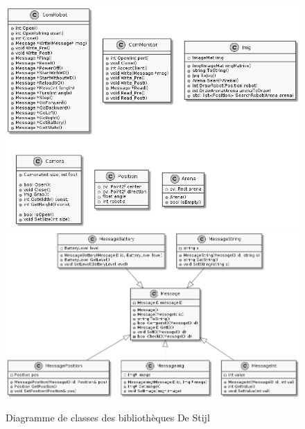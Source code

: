 \begin{appendices}
 \begin{figure}[htbp]
\begin{center}
\includegraphics[scale=0.55]{./figures_pdf/classes1}
\includegraphics[scale=0.55]{./figures_pdf/classes2}
\caption{Diagramme de classes des bibliothèques De Stijl}
\label{fig:diag17}
\end{center}
\end{figure}
\FloatBarrier
\end{appendices}